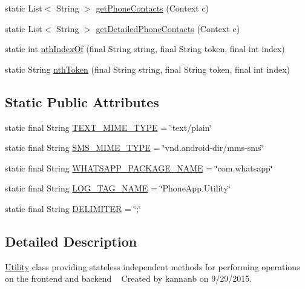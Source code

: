 \begin{DoxyCompactItemize}
static List$<$ String $>$ \hyperlink{classcourse_1_1examples_1_1phoneapp_1_1_utility_a5ef96751af1965557ef365d7426044fa}{get\+Phone\+Contacts} (Context c)
\item 
static List$<$ String $>$ \hyperlink{classcourse_1_1examples_1_1phoneapp_1_1_utility_aa34007fd1fb09ca6de7861b30690c942}{get\+Detailed\+Phone\+Contacts} (Context c)
\item 
static int \hyperlink{classcourse_1_1examples_1_1phoneapp_1_1_utility_ac83e47de24375a97a22cf6a9b75006a0}{nth\+Index\+Of} (final String string, final String token, final int index)
\item 
static String \hyperlink{classcourse_1_1examples_1_1phoneapp_1_1_utility_a3799964a2224cf8b8fb0e85df6bef005}{nth\+Token} (final String string, final String token, final int index)
\end{DoxyCompactItemize}
\subsection*{Static Public Attributes}
\begin{DoxyCompactItemize}
\item 
static final String \hyperlink{classcourse_1_1examples_1_1phoneapp_1_1_utility_a35835b9e24f4150c50657a03448919da}{T\+E\+X\+T\+\_\+\+M\+I\+M\+E\+\_\+\+T\+Y\+P\+E} = \char`\"{}text/plain\char`\"{}
\item 
static final String \hyperlink{classcourse_1_1examples_1_1phoneapp_1_1_utility_a6b677db05046c2fcb1b6770f39bf35f2}{S\+M\+S\+\_\+\+M\+I\+M\+E\+\_\+\+T\+Y\+P\+E} = \char`\"{}vnd.\+android-\/dir/mms-\/sms\char`\"{}
\item 
static final String \hyperlink{classcourse_1_1examples_1_1phoneapp_1_1_utility_ade5eb8c8a3772fbacb49d38f450ca9b5}{W\+H\+A\+T\+S\+A\+P\+P\+\_\+\+P\+A\+C\+K\+A\+G\+E\+\_\+\+N\+A\+M\+E} = \char`\"{}com.\+whatsapp\char`\"{}
\item 
static final String \hyperlink{classcourse_1_1examples_1_1phoneapp_1_1_utility_a91b350654a317da65ecc2bebda4129f7}{L\+O\+G\+\_\+\+T\+A\+G\+\_\+\+N\+A\+M\+E} = \char`\"{}Phone\+App.\+Utility\char`\"{}
\item 
static final String \hyperlink{classcourse_1_1examples_1_1phoneapp_1_1_utility_a7712af7f884a75deb1272dddc4bf5dc9}{D\+E\+L\+I\+M\+I\+T\+E\+R} = \char`\"{};\char`\"{}
\end{DoxyCompactItemize}


\subsection{Detailed Description}
\hyperlink{classcourse_1_1examples_1_1phoneapp_1_1_utility}{Utility} class providing stateless independent methods for performing operations on the frontend and backend ~\newline
 Created by kannanb on 9/29/2015. 

